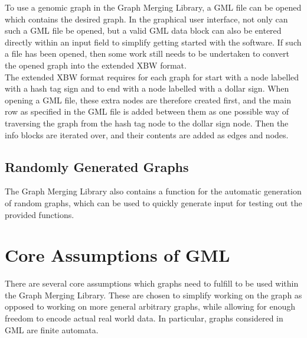 \documentclass[a4paper,12pt,twoside,BCOR=10mm]{scrbook}
\begin{document}
To use a genomic graph in the Graph Merging Library, 
a GML file can be opened which contains the desired graph. 
In the graphical user interface, not only can such a GML file be opened, 
but a valid GML data block can also be entered directly within an input 
field to simplify getting started with the software. 
If such a file has been opened, then some work still needs to be undertaken 
to convert the opened graph into the extended XBW format. \\
The extended XBW format requires for each graph for start with a node labelled with a 
hash tag sign and to end with a node labelled with a dollar sign. 
When opening a GML file, these extra nodes are therefore created first, and the 
main row as specified in the GML file is added between them as one possible way 
of traversing the graph from the hash tag node to the dollar sign node. 
Then the info blocks are iterated over, and their contents are added as edges and nodes.

\subsection{Randomly Generated Graphs}

The Graph Merging Library also contains a function for the automatic generation 
of random graphs, which can be used to quickly generate input for testing out the 
provided functions.


\section{Core Assumptions of GML}
\label{sec:gml_core_assumptions}
%

There are several core assumptions which graphs need to fulfill to be used within the Graph Merging Library. 
These are chosen to simplify working on the graph as opposed to working on more general arbitrary graphs, 
while allowing for enough freedom to encode actual real world data. 
In particular, graphs considered in GML are finite automata.
\end{document}
